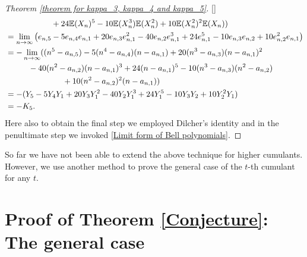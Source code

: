 \documentclass[11pt,reqno]{amsart}
\renewcommand{\(}{\left\(}
\renewcommand{\)}{\right\)}
\renewcommand{\[}{\left\[}
\renewcommand{\]}{\right\]}
\numberwithin{equation}{section}
\theoremstyle{plain}
\begin{document}
\begin{proof}[Theorem \ref{theorem for kappa_3, kappa_4 and kappa_5}][]
{\begin{align*}
&\hspace{2cm}+ 24\mathbb{E}(X_n)^5 - 10\mathbb{E}(X_n^3)\mathbb{E}(X_n^2) + 10\mathbb{E}(X_n^2)^2\mathbb{E}(X_n)) \nonumber\\
&=\lim_{n\rightarrow \infty} \left( e_{n,5} - 5e_{n,4}e_{n,1} +20e_{n,3}e_{n,1}^2 -40e_{n,2}e_{n,1}^3 +24e_{n,1}^5 -10e_{n,3}e_{n,2} +10e_{n,2}^2e_{n,1} \right)  \\
&=-\lim_{n\rightarrow \infty}( (n^5- a_{n,5}) -5(n^4- a_{n,4})(n- a_{n,1}) +20(n^3- a_{n,3})(n- a_{n,1})^2  \nonumber\\
&\hspace{1cm}-40(n^2- a_{n,2})(n-a_{n,1})^3 +24(n-a_{n,1})^5 -10(n^3-a_{n,3})(n^2-a_{n,2})  \\
&\hspace{2.5cm} +10(n^2-a_{n,2})^2(n-a_{n,1}) )  \\
&=- ( Y_5 - 5 Y_4 Y_1 + 20 Y_3 Y_1^2 - 40 Y_2 Y_1^3 + 24 Y_1^5 - 10 Y_3 Y_2 + 10 Y_2^2 Y_1 ) \\
&=- K_5.
\end{align*}}
Here also to obtain the final step we employed  Dilcher's identity \cite[p.~ 85,  Theorem 1]{dilcher} and in the penultimate step we invoked \eqref{Limit form of Bell polynomials}.  
\end{proof}

So far we have not been able to extend the above technique for higher cumulants.  However,   we use another method to prove the general case of the $t$-th cumulant for any $t$.  



\section{Proof of Theorem \ref{Conjecture}: The general case}\label{general case}

\end{document}
